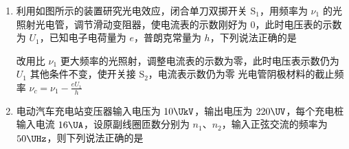 \documentclass[\gkver]{gaokaozhenti}
\begin{document}
\begin{enumerate}
{BC．当 $x = 20 \Ucm$ 时，该装置所测的温度最高，代入解得 $t_{\max} = 31.5 \UdC$

故该装置所测温度不高于 $31.5 \UdC$，当 $x = 0$ 时，该装置所测的温度最低，代入解得 $t_{\min} = 22.5 \UdC$

故该装置所测温度不低于 $22.5 \UdC$，故 B 正确，C 错误；

D．其他条件不变，缓慢把吸管拉出来一点，由盖-吕萨克定律可知，油柱离罐口距离不变，故 D 错误。

故选 B。
}

\item
利用如图所示的装置研究光电效应，闭合单刀双掷开关 S$_{1}$，用频率为 $\nu_{1}$ 的光照射光电管，调节滑动变阻器，使电流表的示数刚好为 0，此时电压表的示数为 $U_{1}$，已知电子电荷量为 $e$，普朗克常量为 $h$，下列说法正确的是


{改用比 $\nu_{1}$ 更大频率的光照射，调整电流表的示数为零，此时电压表示数仍为 $U_{1}$}
{其他条件不变，使开关接 S$_{2}$，电流表示数仍为零}
{光电管阴极材料的截止频率 $\nu_{c} = \nu_{1} - \frac{eU_{1}}{h}$}


\item
电动汽车充电站变压器输入电压为 $10 \UkV$，输出电压为 $220 \UV$，每个充电桩输入电流 $16 \UA$，设原副线圈匝数分别为 $n_{1}$、$n_{2}$，输入正弦交流的频率为 $50 \UHz$，则下列说法正确的是


\end{enumerate}
\end{document}
